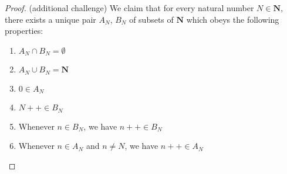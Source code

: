 \begin{proof}{(additional challenge)}
We claim that for every natural number \(N \in \mathbf{N}\), there exists a unique pair \(A_N\), \(B_N\) of subsets of \(\mathbf{N}\) which obeys the following properties:
    \begin{enumerate}
        \item \(A_N \cap B_N = \emptyset\)
        \item \(A_N \cup B_N = \mathbf{N}\)
        \item \(0 \in A_N\)
        \item \(N++ \in B_N\)
        \item Whenever \(n \in B_N\), we have \(n++ \in B_N\)
        \item Whenever \(n \in A_N\) and \(n \neq N\), we have \(n++ \in A_N\)
    \end{enumerate}


\end{proof}
